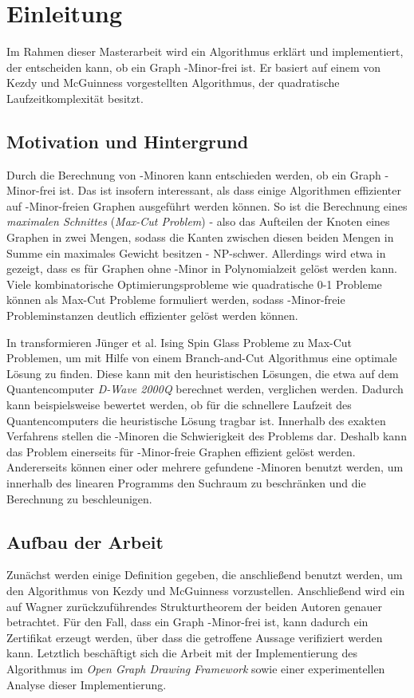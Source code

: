 \chapter{Einleitung}
\label{cha:einleitung}

Im Rahmen dieser Masterarbeit wird ein Algorithmus erklärt und implementiert, der entscheiden kann, ob ein Graph \kf-Minor-frei ist.
Er basiert auf einem von Kezdy und McGuinness \cite{KeM92} vorgestellten Algorithmus, der quadratische Laufzeitkomplexität besitzt.

\section{Motivation und Hintergrund}
\label{sec:motivation_und_hintergrund}
Durch die Berechnung von \kf-Minoren kann entschieden werden, ob ein Graph \kf-Minor-frei ist.
Das ist insofern interessant, als dass einige Algorithmen effizienter auf \kf-Minor-freien Graphen ausgeführt werden können.
So ist die Berechnung eines \emph{maximalen Schnittes} (\emph{Max-Cut Problem}) - also das Aufteilen der Knoten eines Graphen in zwei Mengen, sodass die Kanten zwischen diesen beiden Mengen in Summe ein maximales Gewicht besitzen - NP-schwer\cite{Kar72}.
Allerdings wird etwa in \cite{Bar83} gezeigt, dass es für Graphen ohne \kf-Minor in Polynomialzeit gelöst werden kann.
Viele kombinatorische Optimierungsprobleme wie quadratische 0-1 Probleme können als Max-Cut Probleme formuliert werden\cite{BJR89}, sodass \kf-Minor-freie Probleminstanzen deutlich effizienter gelöst werden können.

In \cite{JLMR+19} transformieren Jünger et al.\nolinebreak[4]\@\xspace Ising Spin Glass Probleme zu Max-Cut Problemen, um mit Hilfe von einem Branch-and-Cut Algorithmus eine optimale Lösung zu finden.
Diese kann mit den heuristischen Lösungen, die etwa auf dem Quantencomputer \emph{D-Wave 2000Q} berechnet werden, verglichen werden.
Dadurch kann beispielsweise bewertet werden, ob für die schnellere Laufzeit des Quantencomputers die heuristische Lösung tragbar ist.
Innerhalb des exakten Verfahrens stellen die \kf-Minoren die Schwierigkeit des Problems dar.
Deshalb kann das Problem einerseits für \kf-Minor-freie Graphen effizient gelöst werden.
Andererseits können einer oder mehrere gefundene \kf-Minoren benutzt werden, um innerhalb des linearen Programms den Suchraum zu beschränken und die Berechnung zu beschleunigen.

\section{Aufbau der Arbeit}
\label{sec:aufbau}
Zunächst werden einige Definition gegeben, die anschließend benutzt werden, um den Algorithmus von Kezdy und McGuinness \cite{KeM92} vorzustellen.
Anschließend wird ein auf Wagner \cite{Wag37} zurückzuführendes Strukturtheorem der beiden Autoren genauer betrachtet.
Für den Fall, dass ein Graph \kf-Minor-frei ist, kann dadurch ein Zertifikat erzeugt werden, über dass die getroffene Aussage verifiziert werden kann.
Letztlich beschäftigt sich die Arbeit mit der Implementierung des Algorithmus im \emph{Open Graph Drawing Framework} sowie einer experimentellen Analyse dieser Implementierung.
